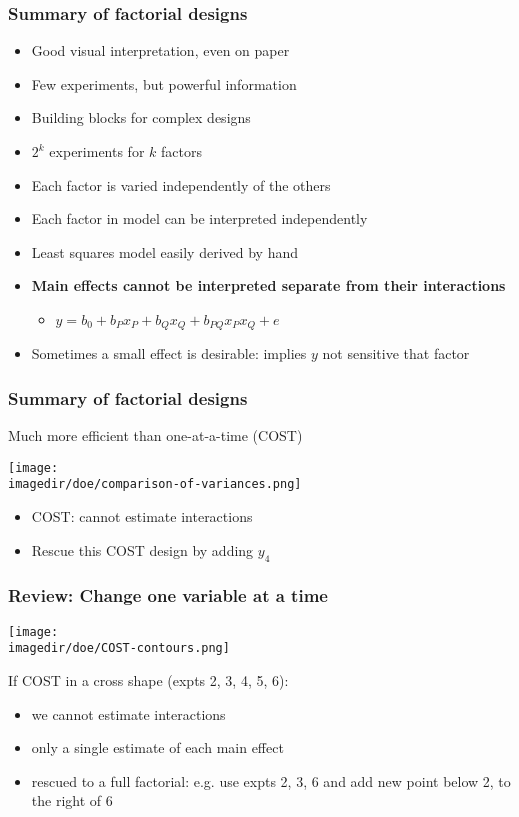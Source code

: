 \begin{frame}\frametitle{Summary of factorial designs}
	\begin{itemize}
		\item	Good visual interpretation, even on paper
		\item	Few experiments, but powerful information
		\item	Building blocks for complex designs
		\item	$2^k$ experiments for $k$ factors
		\item	Each factor is varied independently of the others
		\item	Each factor in model can be interpreted independently
		\item	Least squares model easily derived by hand
		\item	\textbf{Main effects cannot be interpreted separate from their interactions}
		\begin{itemize}
			\item	$y = b_0 + b_P x_P + b_Q x_Q + b_{PQ} x_Px_Q + e$
		\end{itemize}
		\item	Sometimes a small effect is desirable: implies $y$ not sensitive that factor
	\end{itemize}
\end{frame}

\begin{frame}\frametitle{Summary of factorial designs}
	\begin{block}{Much more efficient than one-at-a-time (COST)}
		\begin{center}
			\texttt{[image: \\imagedir/doe/comparison-of-variances.png]}
		\end{center}
	\end{block}
	\begin{itemize}
		\item	COST: cannot estimate interactions
		\item	Rescue this COST design by adding $y_4$
	\end{itemize}
\end{frame}

\begin{frame}\frametitle{Review: Change one variable at a time}
	\begin{center}
		\texttt{[image: \\imagedir/doe/COST-contours.png]}
	\end{center}
	If COST in a cross shape (expts 2, 3, 4, 5, 6):
	\begin{itemize}
		\item	we cannot estimate interactions
		\item	only a single estimate of each main effect
		\item	rescued to a full factorial: e.g. use expts 2, 3, 6 and add new point below 2, to the right of 6
	\end{itemize}
\end{frame}

